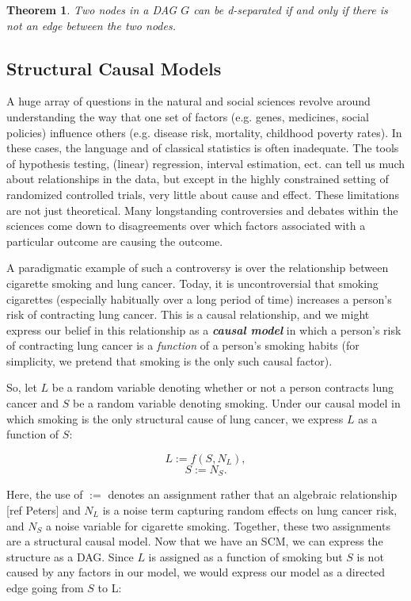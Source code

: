 \documentclass[12pt]{article}
\newtheorem{theorem}{Theorem}
\theoremstyle{definition}
\begin{document}
\begin{theorem}
Two nodes in a DAG $G$ can be d-separated if and only if there is not an edge between the two nodes. 
\end{theorem}

\subsection{Structural Causal Models}
A huge array of questions in the natural and social sciences revolve around understanding the way that one set of factors (e.g. genes, medicines, social policies) influence others (e.g. disease risk, mortality, childhood poverty rates). In these cases, the language and  of classical statistics is often inadequate. The tools of hypothesis testing, (linear) regression, interval estimation, ect. can tell us much about relationships in the data, but except in the highly constrained setting of randomized controlled trials, very little about cause and effect. These limitations are not just theoretical. Many longstanding controversies and debates within the sciences come down to disagreements over which factors associated with a particular outcome are causing the outcome. 

A paradigmatic example of such a controversy is over the relationship between cigarette smoking and lung cancer. Today, it is uncontroversial that smoking cigarettes (especially habitually over a long period of time) increases a person's risk of contracting lung cancer. This is a causal relationship, and we might express our belief in this relationship as a \textbf{\emph{causal model}} in which a person's risk of contracting lung cancer is a \emph{function} of a person's smoking habits (for simplicity, we  pretend that smoking is the only such causal factor).

So, let $L$ be a random variable denoting whether or not a person contracts lung cancer and $S$ be a random variable denoting smoking. Under our causal model in which smoking is the only structural cause of lung cancer, we express $L$ as a function of $S$:

$$L :=f(S, N_L),$$
$$S := N_S.$$ 

Here, the use of $:=$ denotes an assignment rather that an algebraic relationship [ref Peters] and $N_L$ is a noise term capturing random effects on lung cancer risk, and $N_S$ a noise variable for cigarette smoking. Together, these two assignments are a  structural causal model.  Now that we have an SCM, we can express the structure as a DAG. Since $L$ is assigned as a function of smoking but $S$ is not caused by any factors in our model, we would express our model as a directed edge going from $S$ to L:
\end{document}
